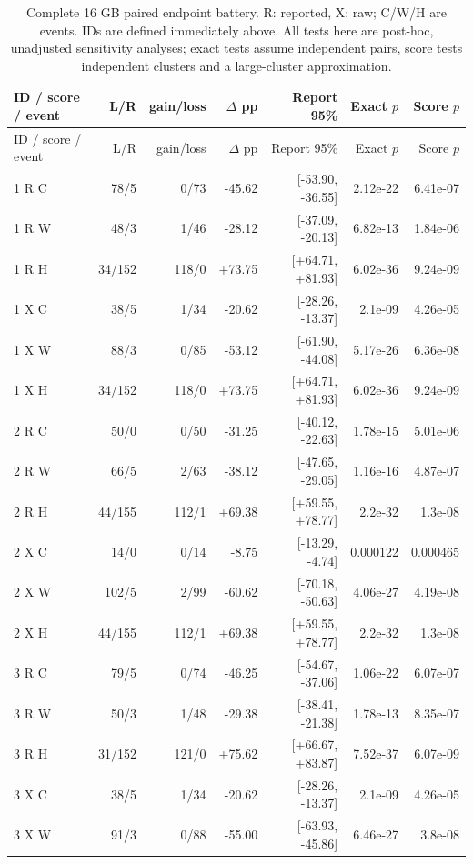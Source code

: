 \begin{longtable}{lrrrrrr}
\caption{Complete 16 GB paired endpoint battery. R: reported, X: raw; C/W/H are events. IDs are defined immediately above. All tests here are post-hoc, unadjusted sensitivity analyses; exact tests assume independent pairs, score tests independent clusters and a large-cluster approximation.}\label{tab:battery-tier16}\\
ID / score / event & L/R & gain/loss & $\Delta$ pp & Report 95\% & Exact $p$ & Score $p$\\\toprule\endfirsthead
ID / score / event & L/R & gain/loss & $\Delta$ pp & Report 95\% & Exact $p$ & Score $p$\\\toprule\endhead
1 R C & 78/5 & 0/73 & -45.62 & [-53.90, -36.55] & 2.12e-22 & 6.41e-07\\
1 R W & 48/3 & 1/46 & -28.12 & [-37.09, -20.13] & 6.82e-13 & 1.84e-06\\
1 R H & 34/152 & 118/0 & +73.75 & [+64.71, +81.93] & 6.02e-36 & 9.24e-09\\
1 X C & 38/5 & 1/34 & -20.62 & [-28.26, -13.37] & 2.1e-09 & 4.26e-05\\
1 X W & 88/3 & 0/85 & -53.12 & [-61.90, -44.08] & 5.17e-26 & 6.36e-08\\
1 X H & 34/152 & 118/0 & +73.75 & [+64.71, +81.93] & 6.02e-36 & 9.24e-09\\
2 R C & 50/0 & 0/50 & -31.25 & [-40.12, -22.63] & 1.78e-15 & 5.01e-06\\
2 R W & 66/5 & 2/63 & -38.12 & [-47.65, -29.05] & 1.16e-16 & 4.87e-07\\
2 R H & 44/155 & 112/1 & +69.38 & [+59.55, +78.77] & 2.2e-32 & 1.3e-08\\
2 X C & 14/0 & 0/14 & -8.75 & [-13.29, -4.74] & 0.000122 & 0.000465\\
2 X W & 102/5 & 2/99 & -60.62 & [-70.18, -50.63] & 4.06e-27 & 4.19e-08\\
2 X H & 44/155 & 112/1 & +69.38 & [+59.55, +78.77] & 2.2e-32 & 1.3e-08\\
3 R C & 79/5 & 0/74 & -46.25 & [-54.67, -37.06] & 1.06e-22 & 6.07e-07\\
3 R W & 50/3 & 1/48 & -29.38 & [-38.41, -21.38] & 1.78e-13 & 8.35e-07\\
3 R H & 31/152 & 121/0 & +75.62 & [+66.67, +83.87] & 7.52e-37 & 6.07e-09\\
3 X C & 38/5 & 1/34 & -20.62 & [-28.26, -13.37] & 2.1e-09 & 4.26e-05\\
3 X W & 91/3 & 0/88 & -55.00 & [-63.93, -45.86] & 6.46e-27 & 3.8e-08\\

\end{longtable}
